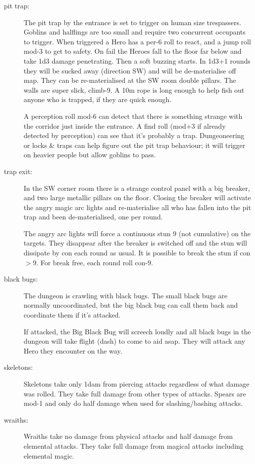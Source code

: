 \begin{description}
\item[pit trap:] The pit trap by the entrance is set to trigger on human size trespassers. Goblins and halflings are too small and require two concurrent occupants to trigger. When triggered a Hero has a per-6 roll to react, and a jump roll mod-3 to get to safety. On fail the Heroes fall to the floor far below and take 1d3 damage penetrating. Then a soft buzzing starts. In 1d3+1 rounds they will be sucked away (direction SW) and will be de-materialise off map. They can be re-materialised at the SW room double pillars.
The walls are super slick, climb-9. A 10m rope is long enough to help fish out anyone who is trapped, if they are quick enough.

A perception roll mod-6 can detect that there is something strange with the corridor just inside the entrance. A find roll (mod+3 if already detected by perception) can see that it's probably a trap. Dungeoneering or locks \& traps can help figure out the pit trap behaviour; it will trigger on heavier people but allow goblins to pass.

\item[trap exit:] In the SW corner room there is a strange control panel with a big breaker, and two large metallic pillars on the floor. Closing the breaker will activate the angry magic arc lights and re-materialise all who has fallen into the pit trap and been de-materialised, one per round.

The angry arc lights will force a continuous stun 9 (not cumulative) on the targets. They disappear after the breaker is switched off and the stun will dissipate by con each round as usual. It is possible to break the stun if con$>$9. For break free, each round roll con-9.

\item[black bugs:] The dungeon is crawling with black bugs. The small black bugs are normally uncoordinated, but the big black bug can call them back and coordinate them if it's attacked.

If attacked, the Big Black Bug will screech loudly and all black bugs in the dungeon will take flight (dash) to come to aid asap. They will attack any Hero they encounter on the way.

\item[skeletons:] Skeletons take only 1dam from piercing attacks regardless of what damage was rolled. They take full damage from other types of attacks. Spears are mod-1 and only do half damage when used for slashing/bashing attacks.

\item[wraiths:] Wraiths take no damage from physical attacks and half damage from elemental attacks. They take full damage from magical attacks including elemental magic.
\end{description}



